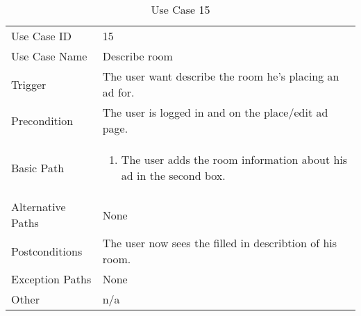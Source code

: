\begin{table}[H]
\centering
\label{table-use-case-15}
\begin{tabular}{|p{3cm}|p{10cm}}
Use Case ID       & 15                                                      \\
Use Case Name     & Describe room                            \\
Trigger           & The user want describe the room he's placing an ad for.\\
Precondition      & The user is logged in and on the place/edit ad page.            
\\
Basic Path        & \begin{enumerate}
\item		The user adds the room information about his ad in the second box. 
\end{enumerate} 
     \\
Alternative Paths & None                          \\
Postconditions    & The user now sees the filled in describtion of his room.	\\
Exception Paths   & None			\\
Other             & n/a                                                                                                                                                                                                        
\end{tabular}
\caption{Use Case 15}
\end{table}

